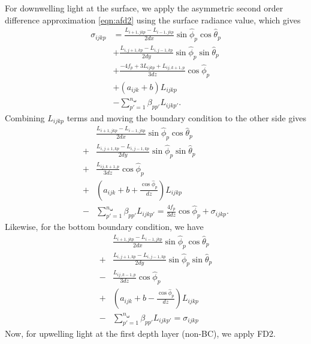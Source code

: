 \documentclass[ms,cpyr,lof,lot]{uathesis}
\renewcommand\vec\bm
\begin{document}
For downwelling light at the surface, we apply the asymmetric second order difference approximation \eqref{eqn:afd2}
using the surface radiance value, which gives
\begin{equation*}
  \begin{aligned}
    \sigma_{ijkp} &= \frac{L_{i+1,jkp}-L_{i-1,jkp}}{2dx}\sin\hat{\phi}_p\cos\hat{\theta}_p \\
    &+ \frac{L_{i,j+1,kp}-L_{i,j-1,kp}}{2dy}\sin\hat{\phi}_p\sin\hat{\theta}_p \\
    &+ \frac{-4f_p + 3L_{ijkp} + L_{ij,k+1,p}}{3dz}\cos\hat{\phi}_p \\
    &+ (a_{ijk}+b)L_{ijkp} \\
    &- \sum_{p'=1}^{n_{\vec{\omega}}} \beta_{pp'} L_{ijkp'}.
  \end{aligned}
\end{equation*}
Combining $L_{ijkp}$ terms and moving the boundary condition to the other side gives
\begin{equation*}
  \begin{aligned}
    &\frac{L_{i+1,jkp}-L_{i-1,jkp}}{2dx}\sin\hat{\phi}_p\cos\hat{\theta}_p \\
    + &\frac{L_{i,j+1,kp}-L_{i,j-1,kp}}{2dy}\sin\hat{\phi}_p\sin\hat{\theta}_p \\
    + &\frac{L_{ij,k+1,p}}{3dz}\cos\hat{\phi}_p \\
    + &\left(a_{ijk}+b + \frac{\cos\hat{\phi}_p}{dz} \right) L_{ijkp} \\
    - &\sum_{p'=1}^{n_{\vec{\omega}}} \beta_{pp'} L_{ijkp'} = \frac{4f_p}{3dz} \cos\hat{\phi}_p + \sigma_{ijkp}.
  \end{aligned}
\end{equation*}
Likewise, for the bottom boundary condition, we have
\begin{equation*}
  \begin{aligned}
    &\frac{L_{i+1,jkp}-L_{i-1,jkp}}{2dx}\sin\hat{\phi}_p\cos\hat{\theta}_p \\
    + &\frac{L_{i,j+1,kp}-L_{i,j-1,kp}}{2dy}\sin\hat{\phi}_p\sin\hat{\theta}_p \\
    - &\frac{L_{ij,k-1,p}}{3dz}\cos\hat{\phi}_p \\
    + &\left(a_{ijk}+b - \frac{\cos\hat{\phi}_p}{dz} \right) L_{ijkp} \\
    - &\sum_{p'=1}^{n_{\vec{\omega}}} \beta_{pp'} L_{ijkp'} = \sigma_{ijkp}
  \end{aligned}
\end{equation*}
Now, for upwelling light at the first depth layer (non-BC), we apply FD2.
\end{document}
